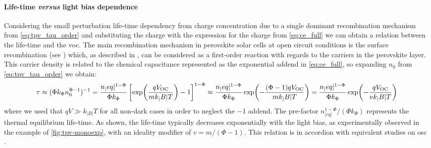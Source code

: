 	\paragraph{Life\hyp{}time \textsl{versus} light bias dependence}\label{tpv_tau_vs_intensity}
	Considering the small perturbation life\hyp{}time dependency from charge concentration due to a single dominant recombination mechanism from \cref{eq:tpv_tau_order} and substituting the charge with the expression for the charge from \cref{eq:ce_full} we can obtain a relation between the life\hyp{}time and the \gls{voc}.
	The main recombination mechanism in perovskite solar cells at open circuit conditions is the surface recombination (see ) which, as described in , can be considered as a first\hyp{}order reaction with regards to the carriers \label{tpv_chemical_charge}in the perovskite layer.
	This carrier density is related to the chemical capacitance represented as the exponential addend in \cref{eq:ce_full}, so expanding $n_0$ from \cref{eq:tpv_tau_order} we obtain:
	\begin{dmath}\label{eq:tpv_tau_vs_intensity}
		\tau \approx (\Phi k_\Phi n_0^{\Phi-1})^{-1} = \frac{n_|eq|^{1-\Phi}}{\Phi k_\Phi} \left[\exp(\frac{q\voc}{mk_|B|T}) - 1\right]^{1-\Phi} \approx \frac{n_|eq|^{1-\Phi}}{\Phi k_\Phi} \exp(-\frac{(\Phi-1)q\voc}{mk_|B|T}) = \frac{n_|eq|^{1-\Phi}}{\Phi k_\Phi} \exp(-\frac{q\voc}{vk_|B|T})
	\end{dmath}
	where we used that $qV \gg k_|B|T$ for all non-dark cases in order to neglect the $-1$ addend.
	The pre\hyp{}factor $n_|eq|^{1-\Phi}/(\Phi k_\Phi)$ represents the thermal equilibrium life\hyp{}time.
	As shown, the life\hyp{}time typically decreases exponentially with the light bias, as experimentally observed in the example of \cref{fig:tpv-monoexp}, with an ideality modifier of $v = m/(\Phi-1)$.
	This relation is in accordion with equivalent studies on \gls{osc} \cite{Shuttle2008,Shuttle2008d,Credgington2011}.


